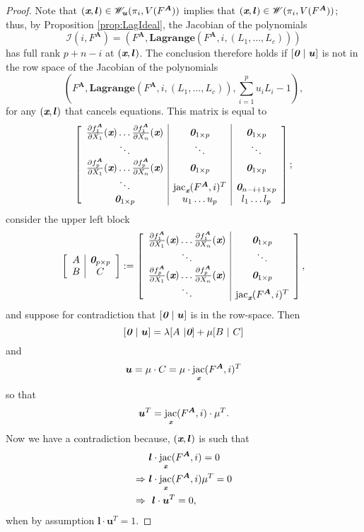 \documentclass[a4paper]{article}
\def\sI{\mathscr{I}}
\def\bz{\textit{\textbf{0}}}
\def\mA{{\bm A}}
\def\ub{{\bm u}}
\def\lb{{\bm l}}
\def\xb{\textit{\textbf{x}}}
\DeclareMathOperator{\jac}{jac}
\def\pa{\partial}
\def\lagFA{{\bm{Lagrange}}(F^{\mA},i,(L_1,\hdots,L_c))}
\def\udl{\sum_{i=1}^pu_iL_i}
\begin{document}
    \begin{proof}
    Note that $(\xb,\lb)\in\mathscr{W}_{\ub}(\pi_i,V(F^{\mA}))$ implies that $(\xb,\lb)\in\mathscr{W}(\pi_i,V(F^{\mA}))$; thus, by Proposition \ref{prop:LagIdeal}, the Jacobian of the polynomials \[\sI(i,F^{\mA}) = (F^{\mA},\lagFA)\] has full rank $p+n-i$ at $(\xb,\lb)$. The conclusion therefore holds if $[\bz~|~\ub]$ is not in the row space of the Jacobian of the polynomials
    \[
    \left(F^{\mA},\lagFA,\udl -1\right),
    \]
    for any $(\xb,\bm l)$ that cancels equations. This matrix is equal to
    \[
    \left[ 
    \begin{array}{c|c|c}
    \frac{\pa f_1^{\mA}}{\pa X_1}(\xb) \hdots \frac{\pa f_1^{\mA}}{\pa X_n}(\xb) & \bz_{1\times p} & \bz_{1\times p}\\
    \ddots & \ddots & \ddots\\
    \frac{\pa f_p^{\mA}}{\pa X_1}(\xb) \hdots \frac{\pa f_p^{\mA}}{\pa X_n}(\xb) & \bz_{1\times p} & \bz_{1\times p}\\
    \ddots &\jac_{\xb}(F^{\mA},i)^T & \bz_{n-i+1\times p}\\
    \bz_{1 \times p} & u_1 \hdots u_p & l_1 \hdots l_p 
    \end{array}
    \right];
    \]
    consider the upper left block
    \[
    \left[ 
    \begin{array}{c|c}
    A & \bz_{p\times p} \\
    B & C 
    \end{array}
    \right]
    :=
    \left[ 
    \begin{array}{c|c}
    \frac{\pa f_1^{\mA}}{\pa X_1}(\xb) \hdots \frac{\pa f_1^{\mA}}{\pa X_n}(\xb) & \bz_{1\times p} \\
    \ddots & \ddots \\
    \frac{\pa f_p^{\mA}}{\pa X_1}(\xb) \hdots \frac{\pa f_p^{\mA}}{\pa X_n}(\xb) & \bz_{1\times p} \\
    \ddots &\jac_{\xb}(F^{\mA},i)^T
    \end{array}
    \right],
    \]
    and suppose for contradiction that $[\bz~|~\ub]$ is in the row-space. Then 
    \[
    [\bz~|~\ub]
    =
    \lambda [A~|\bz] + \mu[B~|~C]
    \]
    and 
    \[
    \ub = \mu \cdot C = \mu \cdot \jac_{\xb} (F^{\mA},i)^T
    \]
    so that 
    \[
    \ub^T = \jac_{\xb} (F^{\mA},i) \cdot \mu^T.
    \]
    Now we have a contradiction because, $(\xb,\lb)$ is such that 
    \begin{align*}
        &\lb \cdot \jac_{\xb} (F^{\mA},i)=0\\
        \Rightarrow
        ~&\lb \cdot \jac_{\xb} (F^{\mA},i) \mu^T= 0\\
        \Rightarrow
        ~&~\lb \cdot \ub^T = 0,
    \end{align*}
    when by assumption $\lb \cdot \ub^T = 1.$ 
    \end{proof}
\end{document}

